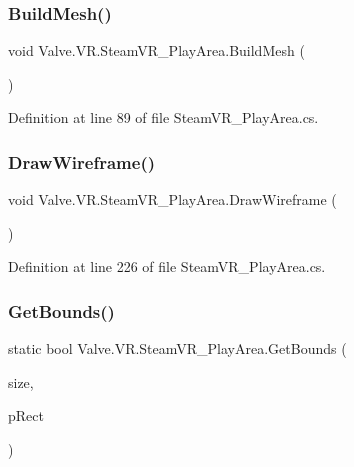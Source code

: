 \subsubsection{\texorpdfstring{BuildMesh()}{BuildMesh()}}
{\footnotesize\ttfamily void Valve.\+V\+R.\+Steam\+V\+R\+\_\+\+Play\+Area.\+Build\+Mesh (\begin{DoxyParamCaption}{ }\end{DoxyParamCaption})}



Definition at line 89 of file Steam\+V\+R\+\_\+\+Play\+Area.\+cs.

\mbox{\label{class_valve_1_1_v_r_1_1_steam_v_r___play_area_aa80fbe05c10df6dd528393dd3f267c77}} 
\subsubsection{\texorpdfstring{DrawWireframe()}{DrawWireframe()}}
{\footnotesize\ttfamily void Valve.\+V\+R.\+Steam\+V\+R\+\_\+\+Play\+Area.\+Draw\+Wireframe (\begin{DoxyParamCaption}{ }\end{DoxyParamCaption})}



Definition at line 226 of file Steam\+V\+R\+\_\+\+Play\+Area.\+cs.

\mbox{\label{class_valve_1_1_v_r_1_1_steam_v_r___play_area_ae0c43679b65e56dcef65bb1ee5da2553}} 
\subsubsection{\texorpdfstring{GetBounds()}{GetBounds()}}
{\footnotesize\ttfamily static bool Valve.\+V\+R.\+Steam\+V\+R\+\_\+\+Play\+Area.\+Get\+Bounds (\begin{DoxyParamCaption}\item[{\mbox{\hyperlink{class_valve_1_1_v_r_1_1_steam_v_r___play_area_a4c0fc5be21f78998e4a1fbef713d2f24}{Size}}}]{size,  }\item[{ref \mbox{\hyperlink{struct_valve_1_1_v_r_1_1_hmd_quad__t}{Hmd\+Quad\+\_\+t}}}]{p\+Rect }\end{DoxyParamCaption})\hspace{0.3cm}{\ttfamily [static]}}



